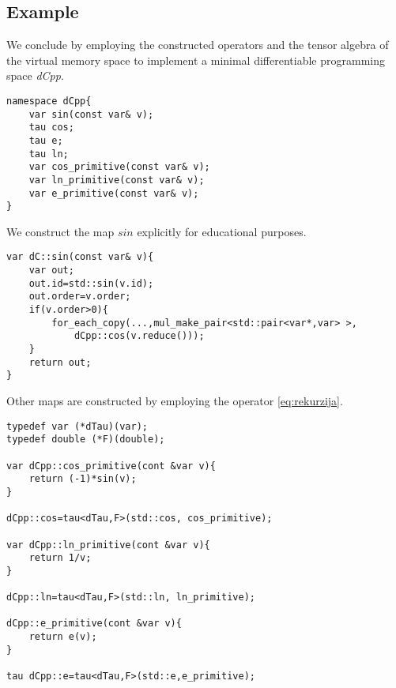 \subsection{Example}

We conclude by employing the constructed operators and the tensor algebra of the virtual memory space to implement a minimal differentiable programming space \emph{dCpp}.

\begin{lstlisting}
namespace dCpp{
    var sin(const var& v);
    tau cos;
    tau e;
    tau ln;
    var cos_primitive(const var& v);
    var ln_primitive(const var& v);
    var e_primitive(const var& v);
}
\end{lstlisting}

We construct the map $sin$ explicitly for educational purposes.

\begin{lstlisting}
var dC::sin(const var& v){
    var out;
    out.id=std::sin(v.id);
    out.order=v.order;
    if(v.order>0){
    	for_each_copy(...,mul_make_pair<std::pair<var*,var> >,
    		dCpp::cos(v.reduce()));
    }
    return out;
}
\end{lstlisting}
Other maps are constructed by employing the operator \eqref{eq:rekurzija}.
\begin{lstlisting}
typedef var (*dTau)(var);
typedef double (*F)(double);

var dCpp::cos_primitive(cont &var v){
    return (-1)*sin(v);
}

dCpp::cos=tau<dTau,F>(std::cos, cos_primitive);

var dCpp::ln_primitive(cont &var v){
    return 1/v;
}

dCpp::ln=tau<dTau,F>(std::ln, ln_primitive);

dCpp::e_primitive(cont &var v){
    return e(v);
}

tau dCpp::e=tau<dTau,F>(std::e,e_primitive);

\end{lstlisting}
